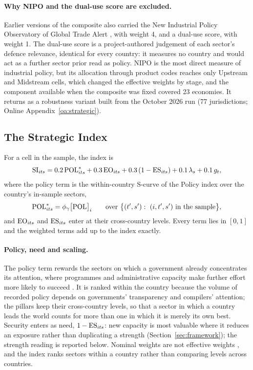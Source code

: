 \paragraph{Why NIPO and the dual-use score are excluded.}\label{subsec:policy_nipo} Earlier versions
of the composite also carried the New Industrial Policy Observatory of Global Trade Alert
\citep[NIPO;][]{gta2026nipo,evenett2024return}, with weight 4, and a dual-use score, with weight 1.
The dual-use score is a project-authored judgement of each sector's defence relevance, identical
for every country: it measures no country and would act as a further sector prior read as policy.
NIPO is the most direct measure of industrial policy, but its allocation through product codes
reaches only Upstream and Midstream cells, which changed the effective weights by stage, and the
component available when the composite was fixed covered 23 economies. It returns as a robustness
variant built from the October 2026 run (77 jurisdictions; Online Appendix~\ref{oa:strategic}).

\subsection{The Strategic Index}\label{subsec:si_definition}

For a cell in the sample, the index is
\begin{equation}\label{eq:si}
  \mathrm{SI}_{its}=0.2\,\mathrm{POL}^{*}_{its}+0.3\,\mathrm{EO}_{its}+0.3\,(1-\mathrm{ES}_{its})+0.1\,\lambda_s+0.1\,g_t,
\end{equation}
where the policy term is the within-country S-curve of the Policy index over the country's
in-sample sectors,
\begin{equation}\label{eq:si_pol}
  \mathrm{POL}^{*}_{its}={\phi_{\gamma}}\big[\mathrm{POL}\big]_{i}\qquad\text{over }
  \big\{(t',s'):\ (i,t',s')\ \text{in the sample}\big\},
\end{equation}
and $\mathrm{EO}_{its}$ and $\mathrm{ES}_{its}$ enter at their cross-country levels. Every term lies in $[0,1]$ and
the weighted terms add up to the index exactly.

\paragraph{Policy, need and scaling.} The policy term rewards the sectors on which a government
already concentrates its attention, where programmes and administrative capacity make further
effort more likely to succeed \citep{rodrik2004industrial,juhasz2024new}. It is ranked within the
country because the volume of recorded policy depends on governments' transparency and compilers'
attention; the pillars keep their cross-country levels, so that a sector in which a country leads
the world counts for more than one in which it is merely its own best. Security enters as need,
$1-\mathrm{ES}_{its}$: new capacity is most valuable where it reduces an exposure rather than duplicating a
strength (Section~\ref{sec:framework}); the strength reading is reported below. Nominal weights are
not effective weights \citep{paruolo2013ratings,becker2017weights}, and the index ranks sectors
within a country rather than comparing levels across countries.

